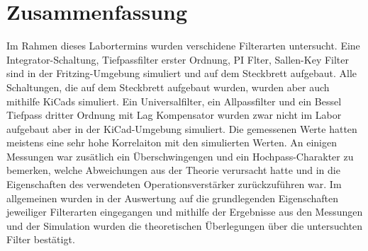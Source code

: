 %
%
%
\section{Zusammenfassung}
%


Im Rahmen dieses Labortermins wurden verschidene Filterarten untersucht. Eine Integrator-Schaltung, Tiefpassfilter erster Ordnung, PI Flter, Sallen-Key Filter sind in der Fritzing-Umgebung simuliert und auf dem Steckbrett aufgebaut. Alle Schaltungen, die auf dem Steckbrett aufgebaut wurden, wurden aber auch mithilfe KiCads simuliert. Ein Universalfilter, ein Allpassfilter und ein Bessel Tiefpass dritter Ordnung mit Lag Kompensator wurden zwar nicht im Labor aufgebaut aber in der KiCad-Umgebung simuliert. Die gemessenen Werte hatten meistens eine sehr hohe Korrelaiton mit den simulierten Werten. An einigen Messungen war zusätlich ein Überschwingengen und ein Hochpass-Charakter zu bemerken, welche Abweichungen aus der Theorie verursacht hatte und in die Eigenschaften des verwendeten Operationsverstärker zurückzuführen war. Im allgemeinen wurden in der Auswertung auf die grundlegenden Eigenschaften jeweiliger Filterarten eingegangen und mithilfe der Ergebnisse aus den Messungen  und der Simulation wurden die theoretischen Überlegungen über die untersuchten Filter bestätigt.

 


